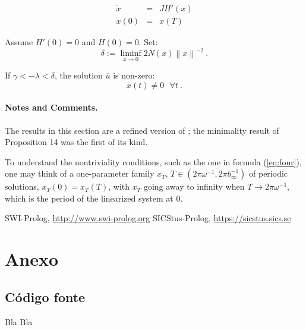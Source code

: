 \documentclass{llncs}
\begin{document}
\begin{equation}
\begin{array}{rcl}
  \dot{x}&=&JH' (x)\\
  x(0)&=&x (T)
\end{array}
\end{equation}


\begin{proposition}
Assume $H'(0)=0$ and $ H(0)=0$. Set:
\begin{equation}
  \delta := \liminf_{x\to 0} 2 N (x) \left\|x\right\|^{-2}\ .
  \label{eq:one}
\end{equation}

If $\gamma < - \lambda < \delta$,
the solution $\overline{u}$ is non-zero:
\begin{equation}
  \overline{x} (t) \ne 0\ \ \ \forall t\ .
\end{equation}
\end{proposition}


\paragraph{Notes and Comments.}
The results in this section are a
refined version of \cite{clar:eke};
the minimality result of Proposition
14 was the first of its kind.

To understand the nontriviality conditions, such as the one in formula
(\ref{eq:four}), one may think of a one-parameter family
$x_{T}$, $T\in \left(2\pi\omega^{-1}, 2\pi b_{\infty}^{-1}\right)$
of periodic solutions, $x_{T} (0) = x_{T} (T)$,
with $x_{T}$ going away to infinity when $T\to 2\pi \omega^{-1}$,
which is the period of the linearized system at 0.

%
%
\begin{thebibliography}{5}
%
SWI-Prolog,
\url{http://www.swi-prolog.org}
SICStus-Prolog,
\url{https://sicstus.sics.se}


\end{thebibliography}
\clearpage

\section*{Anexo}
\subsection*{Código fonte}

Bla Bla
\end{document}
